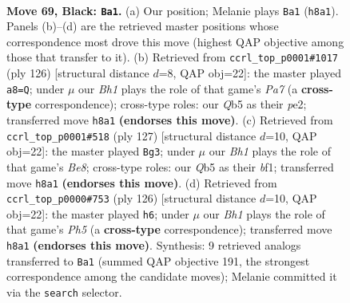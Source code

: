 \documentclass[11pt]{article}
\begin{document}
\clearpage

\begin{figure}[p]\centering
\begin{subfigure}{0.46\textwidth}\centering
\resizebox{\linewidth}{!}{%
\newchessgame
\chessboard[
  setfen={7b/3Pkp2/8/1q6/8/8/7K/8 b - - 2 69},
  showmover=false,
  pgfstyle=straightmove, color=movearrow, markmove={h8-a1}
]}
\caption{}
\end{subfigure}\hfill
\begin{subfigure}{0.46\textwidth}\centering
\resizebox{\linewidth}{!}{%
\newchessgame
\chessboard[
  setfen={8/P1k5/8/8/3pKP2/8/4p3/8 w - - 0 64},
  showmover=false,
  pgfstyle=straightmove, color=movearrow, markmove={a7-a8}
]}
\caption{}
\end{subfigure}
\\[4pt]
\begin{subfigure}{0.46\textwidth}\centering
\resizebox{\linewidth}{!}{%
\newchessgame
\chessboard[
  setfen={8/1K6/8/1Pk5/3p4/8/8/4bB2 b - - 10 64},
  showmover=false,
  pgfstyle=straightmove, color=movearrow, markmove={e1-g3}
]}
\caption{}
\end{subfigure}\hfill
\begin{subfigure}{0.46\textwidth}\centering
\resizebox{\linewidth}{!}{%
\newchessgame
\chessboard[
  setfen={8/8/8/7P/2PKpk2/8/8/8 w - - 2 64},
  showmover=false,
  pgfstyle=straightmove, color=movearrow, markmove={h5-h6}
]}
\caption{}
\end{subfigure}
\caption{\textbf{Move 69, Black: \texttt{Ba1}.} (a) Our position; Melanie plays \texttt{Ba1} (\texttt{h8a1}). Panels (b)--(d) are the retrieved master positions whose correspondence most drove this move (highest QAP objective among those that transfer to it). (b) Retrieved from \texttt{ccrl\_top\_p0001\#1017} (ply 126) [structural distance $d$=8, QAP obj=22]: the master played \texttt{a8=Q}; under $\mu$ our \emph{Bh1} plays the role of that game's \emph{Pa7} (a \textbf{cross-type} correspondence); cross-type roles: our \emph{Q}b5 as their \emph{p}e2; transferred move \texttt{h8a1} \textbf{(endorses this move)}. (c) Retrieved from \texttt{ccrl\_top\_p0001\#518} (ply 127) [structural distance $d$=10, QAP obj=22]: the master played \texttt{Bg3}; under $\mu$ our \emph{Bh1} plays the role of that game's \emph{Be8}; cross-type roles: our \emph{Q}b5 as their \emph{b}f1; transferred move \texttt{h8a1} \textbf{(endorses this move)}. (d) Retrieved from \texttt{ccrl\_top\_p0000\#753} (ply 126) [structural distance $d$=10, QAP obj=22]: the master played \texttt{h6}; under $\mu$ our \emph{Bh1} plays the role of that game's \emph{Ph5} (a \textbf{cross-type} correspondence); transferred move \texttt{h8a1} \textbf{(endorses this move)}. Synthesis: 9 retrieved analogs transferred to \texttt{Ba1} (summed QAP objective 191, the strongest correspondence among the candidate moves); Melanie committed it via the \texttt{search} selector.}
\label{fig:thought-m137}
\end{figure}
\end{document}
